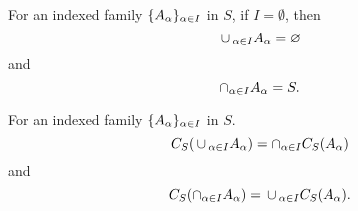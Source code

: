 \begin{prop}
  For an indexed family $\{A_{\alpha}\}_{\alpha \in I}$ in $S$, if $I = \emptyset$, then
  \[
    \,\cup\,_{\alpha \in I} A_{\alpha} = \varnothing
  \]
  and
  \[
    \cap_{\alpha \in I} A_{\alpha} = S.
  \]
\end{prop}

\begin{prop}
  For an indexed family $\{A_{\alpha}\}_{\alpha \in I}$ in $S$.
  \[
    C_S(\,\cup\,_{\alpha \in I} A_{\alpha}) = \cap_{\alpha \in I} C_S(A_{\alpha})
  \]
  and
  \[
    C_S(\cap_{\alpha \in I} A_{\alpha}) = \,\cup\,_{\alpha \in I} C_S(A_{\alpha}).
  \]
\end{prop}

\strats
